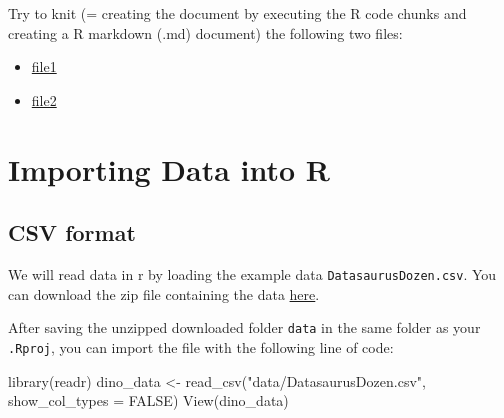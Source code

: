 \documentclass[
  letterpaper,
  DIV=11,
  numbers=noendperiod,
  oneside]{scrreprt}
\newenvironment{Shaded}{\begin{snugshade}}{\end{snugshade}}
\newcommand{\AttributeTok}[1]{\textcolor[rgb]{0.40,0.45,0.13}{#1}}
\newcommand{\ConstantTok}[1]{\textcolor[rgb]{0.56,0.35,0.01}{#1}}
\newcommand{\FunctionTok}[1]{\textcolor[rgb]{0.28,0.35,0.67}{#1}}
\newcommand{\NormalTok}[1]{\textcolor[rgb]{0.00,0.23,0.31}{#1}}
\newcommand{\OtherTok}[1]{\textcolor[rgb]{0.00,0.23,0.31}{#1}}
\newcommand{\StringTok}[1]{\textcolor[rgb]{0.13,0.47,0.30}{#1}}
\begin{document}
Try to knit (= creating the document by executing the R code chunks and
creating a R markdown (.md) document) the following two files:

\begin{itemize}
\item
  \href{./downloadable_files/faux-stub.Rmd}{file1}
\item
  \href{./downloadable_files/mixed-stub.Rmd}{file2}
\end{itemize}


\hypertarget{importing-data-into-r}{%
\chapter{Importing Data into R}\label{importing-data-into-r}}

\hfill\break

\hypertarget{csv-format}{%
\section{CSV format}\label{csv-format}}

We will read data in r by loading the example data
\texttt{DatasaurusDozen.csv}. You can download the zip file containing
the data \href{./downloadable_files/data.zip}{here}.


After saving the unzipped downloaded folder \texttt{data} in the same
folder as your \texttt{.Rproj}, you can import the file with the
following line of code:

\begin{Shaded}
\begin{Highlighting}[]
\FunctionTok{library}\NormalTok{(readr)}
\NormalTok{dino\_data }\OtherTok{\textless{}{-}} \FunctionTok{read\_csv}\NormalTok{(}\StringTok{"data/DatasaurusDozen.csv"}\NormalTok{, }\AttributeTok{show\_col\_types =} \ConstantTok{FALSE}\NormalTok{)}
\FunctionTok{View}\NormalTok{(dino\_data)}
\end{Highlighting}
\end{Shaded}
\end{document}
